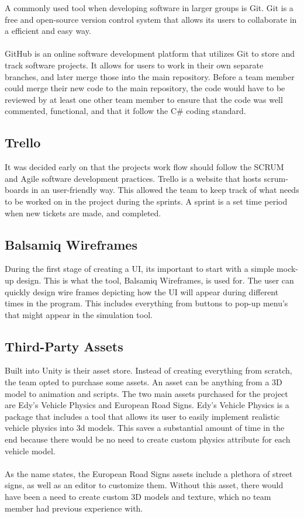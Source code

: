 A commonly used tool when developing software in larger groups is Git. Git is a free and open-source version control system that allows its users to collaborate in a efficient and easy way. 
\\\\
GitHub is an online software development platform that utilizes Git to store and track software projects. It allows for users to work in their own separate branches, and later merge those into the main repository. Before a team member could merge their new code to the main repository, the code would have to be reviewed by at least one other team member to ensure that the code was well commented, functional, and that it follow the C\# coding standard.

\subsection{Trello}

It was decided early on that the projects work flow should follow the SCRUM and Agile software development practices. Trello is a website that hosts scrum-boards in an user-friendly way. This allowed the team to keep track of what needs to be worked on in the project during the sprints. A sprint is a set time period when new tickets are made, and completed.

\subsection{Balsamiq Wireframes}

During the first stage of creating a UI, its important to start with a simple mock-up design. This is what the tool, Balsamiq Wireframes, is used for. The user can quickly design wire frames depicting how the UI will appear during different times in the program. This includes everything from buttons to pop-up menu's that might appear in the simulation tool.

\subsection{Third-Party Assets}

Built into Unity is their asset store. Instead of creating everything from scratch, the team opted to purchase some assets. An asset can be anything from a 3D model to animation and scripts. The two main assets purchased for the project are Edy's Vehicle Physics and European Road Signs. Edy's Vehicle Physics is a package that includes a tool that allows its user to easily implement realistic vehicle physics into 3d models. This saves a substantial amount of time in the end because there would be no need to create custom physics attribute for each vehicle model. 
\\\\
As the name states, the European Road Signs assets include a plethora of street signs, as well as an editor to customize them. Without this asset, there would have been a need to create custom 3D models and texture, which no team member had previous experience with.

